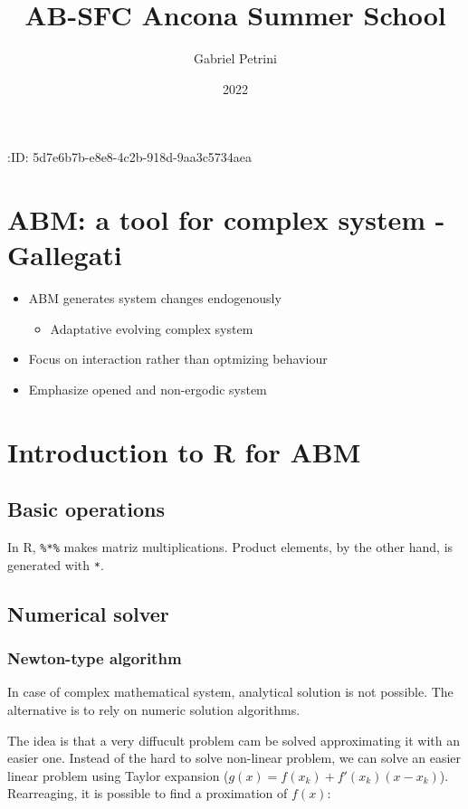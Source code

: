 \documentclass[11pt]{article}
\author{Gabriel Petrini}
\date{2022}
\title{AB-SFC Ancona Summer School}
\begin{document}
\maketitle
:ID:       5d7e6b7b-e8e8-4c2b-918d-9aa3c5734aea

\section*{ABM: a tool for complex system - Gallegati}
\label{sec:org8762c28}

\begin{itemize}
\item ABM generates system changes endogenously
\begin{itemize}
\item Adaptative evolving complex system
\end{itemize}
\item Focus on interaction rather than optmizing behaviour
\item Emphasize opened and non-ergodic system
\end{itemize}


\section*{Introduction to R for ABM}
\label{sec:orgf54ab53}

\subsection*{Basic operations}
\label{sec:org839d058}

In R, \texttt{\%*\%} makes matriz multiplications.
Product elements, by the other hand, is generated with \texttt{*}.

\subsection*{Numerical solver}
\label{sec:org9e4a3ee}



\subsubsection*{Newton-type algorithm}
\label{sec:org6ffedb0}

In case of complex mathematical system, analytical solution is not possible.
The alternative is to rely on numeric solution algorithms.

The idea is that a very diffucult problem cam be solved approximating it with an easier one.
Instead of the hard to solve non-linear problem, we can solve an easier linear problem using Taylor expansion (\(g(x) = f(x_{k}) + f'(x_{k})(x - x_{k})\)).
Rearreaging, it is possible to find a proximation of \(f(x)\):
\end{document}
